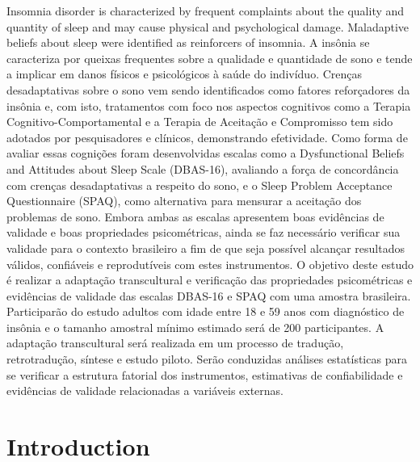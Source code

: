 \documentclass[
  ,doc,11pt, twoside,floatsintext]{apa6}
\begin{document}
Insomnia disorder is characterized by frequent complaints about the quality and quantity of sleep and may cause physical and psychological damage. Maladaptive beliefs about sleep were identified as reinforcers of insomnia. A insônia se caracteriza por queixas frequentes sobre a qualidade e quantidade de sono e tende a implicar em danos físicos e psicológicos à saúde do indivíduo. Crenças desadaptativas sobre o sono vem sendo identificados como fatores reforçadores da insônia e, com isto, tratamentos com foco nos aspectos cognitivos como a Terapia Cognitivo-Comportamental e a Terapia de Aceitação e Compromisso tem sido adotados por pesquisadores e clínicos, demonstrando efetividade. Como forma de avaliar essas cognições foram desenvolvidas escalas como a Dysfunctional Beliefs and Attitudes about Sleep Scale (DBAS-16), avaliando a força de concordância com crenças desadaptativas a respeito do sono, e o Sleep Problem Acceptance Questionnaire (SPAQ), como alternativa para mensurar a aceitação dos problemas de sono. Embora ambas as escalas apresentem boas evidências de validade e boas propriedades psicométricas, ainda se faz necessário verificar sua validade para o contexto brasileiro a fim de que seja possível alcançar resultados válidos, confiáveis e reprodutíveis com estes instrumentos. O objetivo deste estudo é realizar a adaptação transcultural e verificação das propriedades psicométricas e evidências de validade das escalas DBAS-16 e SPAQ com uma amostra brasileira. Participarão do estudo adultos com idade entre 18 e 59 anos com diagnóstico de insônia e o tamanho amostral mínimo estimado será de 200 participantes. A adaptação transcultural será realizada em um processo de tradução, retrotradução, síntese e estudo piloto. Serão conduzidas análises estatísticas para se verificar a estrutura fatorial dos instrumentos, estimativas de confiabilidade e evidências de validade relacionadas a variáveis externas.

\newpage

\hypertarget{introduction}{%
\section{Introduction}\label{introduction}}
\end{document}
